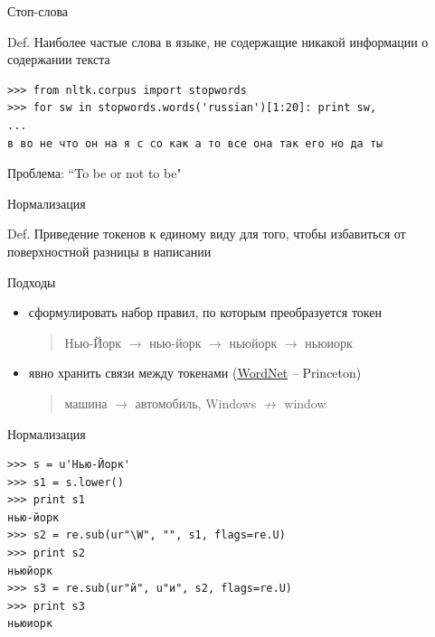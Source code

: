 \documentclass[aspectratio=169]{beamer}
\begin{document}
\begin{frame}[fragile]{Стоп-слова}

\begin{block}{Def.}
Наиболее частые слова в языке, не содержащие никакой информации о содержании текста
\end{block}

\begin{shaded}
{\color{green}
\begin{verbatim}
>>> from nltk.corpus import stopwords
>>> for sw in stopwords.words('russian')[1:20]: print sw,
... 
в во не что он на я с со как а то все она так его но да ты
\end{verbatim}
}
\end{shaded}

\vspace{1em}
Проблема: ``To be or not to be"

\end{frame}


\begin{frame}[fragile]{Нормализация}

\begin{block}{Def.}
Приведение токенов к единому виду для того, чтобы избавиться от поверхностной разницы в написании
\end{block}

\vspace{1em}
Подходы
\begin{itemize}
\item сформулировать набор правил, по которым преобразуется токен
\begin{quote}
Нью-Йорк $\rightarrow$ нью-йорк $\rightarrow$ ньюйорк $\rightarrow$ ньюиорк
\end{quote}
\item явно хранить связи между токенами (\href{http://wordnetweb.princeton.edu/perl/webwn}{WordNet} -- Princeton)
\begin{quote}
машина $\rightarrow$ автомобиль, Windows $\not \rightarrow$ window
\end{quote}
\end{itemize}

\end{frame}


\begin{frame}[fragile]{Нормализация}

\begin{shaded}

{\color{green}
\begin{verbatim}
>>> s = u'Нью-Йорк'
>>> s1 = s.lower()
>>> print s1
нью-йорк
>>> s2 = re.sub(ur"\W", "", s1, flags=re.U)
>>> print s2
ньюйорк
>>> s3 = re.sub(ur"й", u"и", s2, flags=re.U)
>>> print s3
ньюиорк
\end{verbatim}
}
\end{shaded}

\end{frame}
\end{document}

